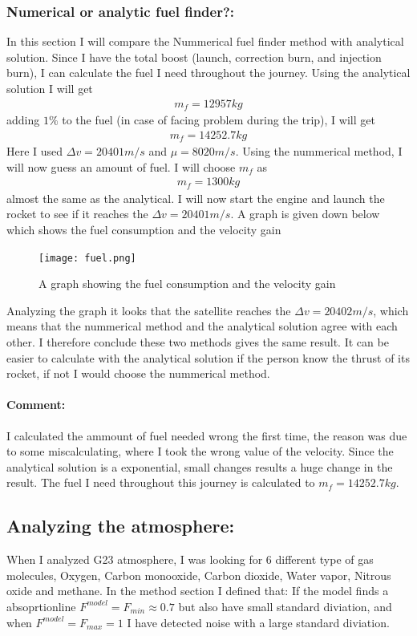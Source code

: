 \documentclass[a4paper,11pt,english]{report}
\begin{document}
\subsubsection{Numerical or analytic fuel finder?:}  In this section
I will compare the Nummerical fuel finder method with analytical solution.
Since I have the total boost (launch, correction burn, and injection burn), I
can calculate the fuel I need throughout the journey. Using the analytical
solution I will get
\begin{align}
m_{f} = 12957kg
\end{align}
adding \(1\%\) to the fuel (in case of facing problem during the trip), I will
get
\begin{align}
  m_{f} = 14252.7kg
\end{align}
Here I used \(\Delta v = 20401m/s\) and \(\mu = 8020m/s\). Using the nummerical
method, I will now guess an amount of fuel. I will choose \(m_{f}\) as
\begin{align}
  m_{f} = 1300kg
\end{align}
almost the same as the analytical. I will now start the engine and launch the
rocket to see if it reaches the \(\Delta v = 20401m/s\). A graph is given down
below which shows the fuel consumption and the velocity gain
\begin{figure}[h]
  \centering
  \texttt{[image: fuel.png]}
  \caption{A graph showing the fuel consumption and the velocity gain}
\end{figure}
Analyzing the graph it looks that the satellite reaches the \(\Delta v =
20402m/s\), which means that the nummerical method and the analytical solution
agree with each other. I therefore conclude these two methods gives the same
result. It can be easier to calculate with the analytical solution if the
person know the thrust of its rocket, if not I would choose the nummerical
method.

\paragraph{Comment:} I calculated the ammount of fuel needed wrong the first
time, the reason was due to some miscalculating, where I took the wrong value
of the velocity. Since the analytical solution is a exponential, small changes
results a huge change in the result. The fuel I need throughout this journey is
calculated to \(m_{f } = 14252.7kg\).

\newpage
\subsection{Analyzing the atmosphere:} When I analyzed G23 atmosphere, I was
looking for 6 different type of gas molecules, Oxygen, Carbon monooxide, Carbon
dioxide, Water vapor, Nitrous oxide and methane. In the method section I
defined that: If the model finds a absoprtionline \(F^{model} = F_{min} \approx
0.7\) but also have small standard diviation, and when \(F^{model} = F_{max} =
1 \) I have detected noise with a large standard diviation.
\end{document}

